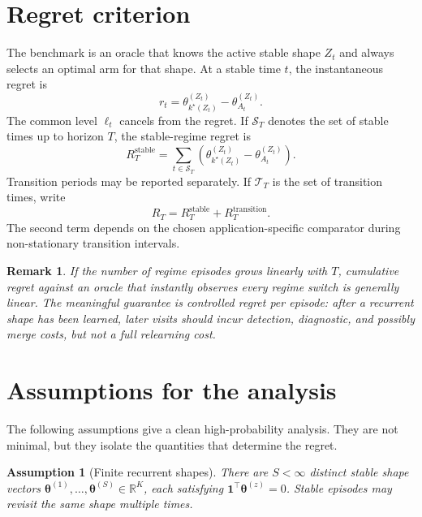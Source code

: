 \documentclass[11pt]{article}
\newtheorem{assumption}{Assumption}
\newtheorem{remark}{Remark}
\newcommand{\Sset}{\mathcal S}
\newcommand{\Tset}{\mathcal T}
\newcommand{\R}{\mathbb R}
\newcommand{\one}{\bm 1}
\begin{document}
\section{Regret criterion}
\label{sec:regret}

The benchmark is an oracle that knows the active stable shape $Z_t$ and always selects an optimal arm for that shape. At a stable time $t$, the instantaneous regret is
\begin{equation}
\label{eq:instantaneous_regret}
r_t
=
\theta_{k^\star(Z_t)}^{(Z_t)}-\theta_{A_t}^{(Z_t)}.
\end{equation}
The common level $\ell_t$ cancels from the regret. If $\Sset_T$ denotes the set of stable times up to horizon $T$, the stable-regime regret is
\begin{equation}
\label{eq:stable_regret}
R_T^{\mathrm{stable}}
=
\sum_{t\in\Sset_T}
\left(
\theta_{k^\star(Z_t)}^{(Z_t)}-\theta_{A_t}^{(Z_t)}
\right).
\end{equation}
Transition periods may be reported separately. If $\Tset_T$ is the set of transition times, write
\begin{equation}
\label{eq:regret_decomposition}
R_T
=
R_T^{\mathrm{stable}}+R_T^{\mathrm{transition}}.
\end{equation}
The second term depends on the chosen application-specific comparator during non-stationary transition intervals.

\begin{remark}
If the number of regime episodes grows linearly with $T$, cumulative regret against an oracle that instantly observes every regime switch is generally linear. The meaningful guarantee is controlled regret per episode: after a recurrent shape has been learned, later visits should incur detection, diagnostic, and possibly merge costs, but not a full relearning cost.
\end{remark}

\section{Assumptions for the analysis}
\label{sec:assumptions}

The following assumptions give a clean high-probability analysis. They are not minimal, but they isolate the quantities that determine the regret.

\begin{assumption}[Finite recurrent shapes]
\label{ass:finite_shapes}
There are $S<\infty$ distinct stable shape vectors $\bm\theta^{(1)},\ldots,\bm\theta^{(S)}\in\R^K$, each satisfying $\one^\top\bm\theta^{(z)}=0$. Stable episodes may revisit the same shape multiple times.
\end{assumption}
\end{document}
